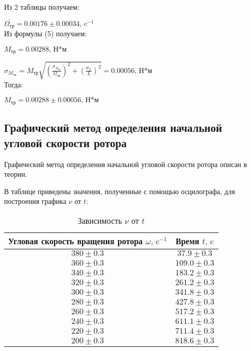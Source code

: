 \documentclass[a4paper]{article}
\begin{document}
Из 2 таблицы получаем:

\item $\overline{\Omega_\text{тр}} = 0.00176 \pm{0.00034} \text{, c$^{-1}$}$\\

Из формулы (5) получаем:

\item $M_\text{тр} = 0.00288 \text{, Н*м}$\\

\item $\sigma_{M_\text{тр}} = M_\text{тр} \sqrt{(\frac{\sigma_{\Omega_\text{тр}}}{\Omega_\text{тр}})^2 + (\frac{\sigma_L}{L})^2} = 0.00056 \text{, Н*м}$\\

Тогда:

\item $M_\text{тр} = 0.00288 \pm{0.00056} \text{, Н*м}$\\

\subsection{Графический метод определения начальной угловой скорости ротора}

Графический метод определения начальной угловой скорости ротора описан в теории. \\

\newpage

В таблице приведены значения, полученные с помощью осцилографа, для построения графика $\nu \text{ от } t$:

\begin{table}[h!]
\centering
\caption{Зависимость $\nu \text{ от } t$}
\begin{tabular}{|c|c|}
\hline
Угловая скорость вращения ротора  $\omega\text{, c$^{-1}$}$ & Время $t\text{, c}$\\ \hline

$380\pm{0.3}$  & $37.9\pm{0.3}$  \\ \hline
$360\pm{0.3}$  & $109.0\pm{0.3}$  \\ \hline
$340\pm{0.3}$  & $183.2\pm{0.3}$  \\ \hline
$320\pm{0.3}$  & $261.2\pm{0.3}$  \\ \hline
$300\pm{0.3}$  & $341.8\pm{0.3}$  \\ \hline
$280\pm{0.3}$  & $427.8\pm{0.3}$  \\ \hline
$260\pm{0.3}$  & $517.2\pm{0.3}$  \\ \hline
$240\pm{0.3}$  & $611.1\pm{0.3}$  \\ \hline
$220\pm{0.3}$  & $711.4\pm{0.3}$  \\ \hline
$200\pm{0.3}$  & $818.6\pm{0.3}$  \\ \hline

\end{tabular}
\end{table}
\end{document}

